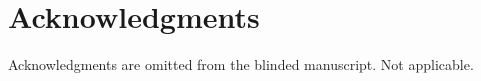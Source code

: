 \section*{Acknowledgments}

\ifblind
Acknowledgments are omitted from the blinded manuscript.
\else
Not applicable.
\fi
